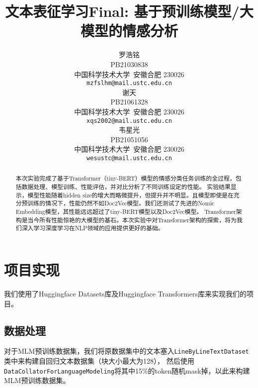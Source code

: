 \documentclass{article}
\title{文本表征学习Final: 基于预训练模型/大模型的情感分析}
\author{
  罗浩铭 \\
  PB21030838\\
  中国科学技术大学\ 安徽合肥 230026 \\
  \texttt{mzfslhm@mail.ustc.edu.cn} \\
  \And
  谢天 \\
  PB21061328\\
  中国科学技术大学\ 安徽合肥 230026 \\
  \texttt{xqs2002@mail.ustc.edu.cn} \\
  \And
  韦星光 \\
  PB21051056\\
  中国科学技术大学\ 安徽合肥 230026 \\
  \texttt{wesustc@mail.ustc.edu.cn} \\
}
\begin{document}
\maketitle


\begin{abstract}
  本次实验完成了基于Transformer（tiny-BERT）模型的情感分类任务训练的全过程，包括数据处理、模型训练、性能评估，并对比分析了不同训练设定的性能。
  实验结果显示，模型性能随着hidden size的增大而略微提升，但提升并不明显。且模型即使是在充分预训练的情况下，性能仍然不如Doc2Vec模型。我们还测试了先进的Nomic Embedding模型，其性能远远超过了tiny-BERT模型以及Doc2Vec模型。
  Transformer架构是当今所有性能惊艳的大模型的基石。本次实验中对Transformer架构的探索，将为我们深入学习深度学习在NLP领域的应用提供更好的基础。
\end{abstract}












\section{项目实现}
我们使用了Huggingface Datasets库及Huggingface Transformers库来实现我们的项目。
\subsection{数据处理}
对于MLM预训练数据集，我们将原数据集中的文本塞入\verb|LineByLineTextDataset|类中来构建自回归文本数据集（块大小最大为128），
然后使用\verb|DataCollatorForLanguageModeling|将其中15\%的token随机mask掉，以此来构建MLM预训练数据集。
\end{document}
